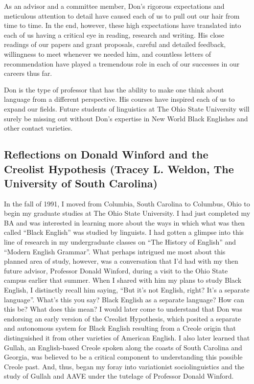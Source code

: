 \documentclass[output=paper, colorlinks,citecolor=brown]{langscibook}
\begin{document}
As an advisor and a committee member, Don’s rigorous expectations and meticulous attention to detail have caused each of us to pull out our hair from time to time. In the end, however, these high expectations have translated into each of us having a critical eye in reading, research and writing. His close readings of our papers and grant proposals, careful and detailed feedback, willingness to meet whenever we needed him, and countless letters of recommendation have played a tremendous role in each of our successes in our careers thus far. 

Don is the type of professor that has the ability to make one think about language from a different perspective. His courses have inspired each of us to expand our fields. Future students of linguistics at The Ohio State University will surely be missing out without Don’s expertise in New World Black Englishes and other contact varieties.

\subsection{Reflections on Donald Winford and the Creolist Hypothesis (Tracey L. Weldon, The University of South Carolina)}

In the fall of 1991, I moved from Columbia, South Carolina to Columbus, Ohio to begin my graduate studies at The Ohio State University. I had just completed my BA and was interested in learning more about the ways in which what was then called “Black English” was studied by linguists. I had gotten a glimpse into this line of research in my undergraduate classes on “The History of English” and “Modern English Grammar”. What perhaps intrigued me most about this planned area of study, however, was a conversation that I’d had with my then future advisor, Professor Donald Winford, during a visit to the Ohio State campus earlier that summer. When I shared with him my plans to study Black English, I distinctly recall him saying, “But it’s not English, right? It’s a separate language”. What’s this you say? Black English as a separate language? How can this be? What does this mean? I would later come to understand that Don was endorsing an early version of the Creolist Hypothesis, which posited a separate and autonomous system for Black English resulting from a Creole origin that distinguished it from other varieties of American English. I also later learned that Gullah, an English-based Creole spoken along the coasts of South Carolina and Georgia, was believed to be a critical component to understanding this possible Creole past. And, thus, began my foray into variationist sociolinguistics and the study of Gullah and AAVE under the tutelage of Professor Donald Winford.
\end{document}
